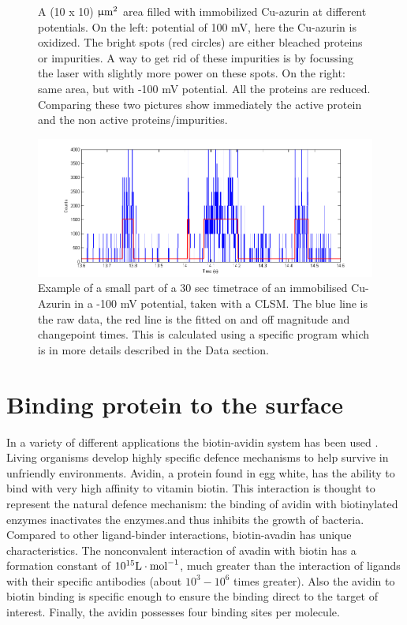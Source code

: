 \documentclass[twoside,single]{lion-msc}
\begin{document}
\begin{figure}
\begin{subfigure}{.5\textwidth}
  \label{}
\end{subfigure}
\caption{A  (10 x 10) $\upmu \textup{m}^{2}$  area filled with immobilized Cu-azurin at different potentials. On the left: potential of 100 mV, here the Cu-azurin is oxidized. The bright spots (red circles) are either bleached proteins or impurities. A way to get rid of these impurities is by focussing the laser with slightly more power on these spots. On the right: same area, but with -100 mV potential. All the proteins are reduced. Comparing these two pictures show immediately the active protein and the non active proteins/impurities.}
\label{finding_proteins}
\end{figure}


\begin{figure}[ht!]
\centering
\includegraphics[width= \textwidth]{TT_example}
\caption{Example of a small part of a 30 sec timetrace of an immobilised Cu-Azurin in a -100 mV potential, taken with a CLSM. The blue line is the raw data, the red line is the fitted on and off magnitude and changepoint times. This is calculated using a specific program which is in more details described in the Data section.} 
\label{TT_exam}
\end{figure}

\section{Binding protein to the surface}\label{neutra}
In a variety of different applications the biotin-avidin system has been used \cite{Diamandis1991}. Living organisms develop highly specific defence mechanisms to help survive in unfriendly environments. Avidin, a protein found in egg white, has the ability to bind with very high affinity to vitamin biotin. This interaction is thought to represent the natural defence mechanism: the binding of avidin with biotinylated enzymes inactivates the enzymes.and thus inhibits the growth of bacteria. Compared to other  ligand-binder interactions, biotin-avadin has unique characteristics. The nonconvalent interaction of avadin with biotin has a formation constant of $10^{15}\textup{L}\cdot \textup{mol}^{-1}$, much greater than the interaction of ligands with their specific antibodies (about $10^{3}-10^{6}$ times greater). Also the avidin to biotin binding is specific enough to ensure the binding direct to the target of interest. Finally, the avidin possesses four binding sites per molecule. 
\end{document}
